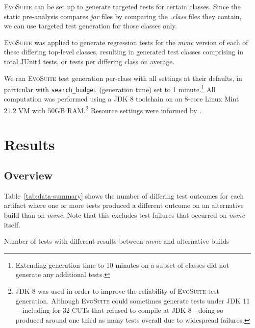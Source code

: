 \documentclass[conference]{IEEEtran}
\makeatletter
\newcommand{\evosuite}{\textsc{EvoSuite}\@\xspace}
\newcommand{\inputgen}[1]{\unskip}
\makeatother
\begin{document}
\evosuite can be set up to generate targeted tests for certain classes. Since the static pre-analysis compares \textit{jar} files by comparing the \textit{.class} files they contain, we can use targeted test generation for those classes only.   

\evosuite was applied to generate regression tests for the \textit{mvnc} version of each of these \inputgen{num-top-level-class-pairs-after-invokevirtual-invokeinterface} differing top-level classes, resulting in \inputgen{num-classes-with-generated-tests} generated test classes comprising in total \inputgen{num-generated-tests} JUnit4 tests, or \inputgen{avg-tests-per-class} tests per differing class on average.

We ran \evosuite test generation per-class with all settings at their defaults, in particular with \texttt{search\_budget} (generation time) set to 1 minute.\footnote{Extending generation time to 10 minutes on a subset of classes did not generate any additional tests.}
All computation was performed using a JDK 8 toolchain on an 8-core Linux Mint 21.2 VM with 50GB RAM.\footnote{JDK 8 was used in order to improve the reliability of \evosuite test generation. Although \evosuite could sometimes generate tests under JDK 11---including for 32 CUTs that refused to compile at JDK 8---doing so produced around one third as many tests overall due to widespread failures.}
Resource settings were informed by \cite{jahangirova2023sbft}. 


\section{Results}
\label{sec:results}

\subsection{Overview}

Table~\ref{tab:data-summary} shows the number of differing test outcomes for each artifact where one or more tests produced a different outcome on an alternative build than on \textit{mvnc}.
Note that this excludes \inputgen{num-test-failures-on-mvnc} test failures that occurred on \textit{mvnc} itself.

\begin{table}[h]
	\centering
    \caption{Number of tests with different results between \textit{mvnc} and alternative builds}
	\label{tab:data-summary}
	\inputgen{data-summary-table-tabular}
	
\end{table}
\end{document}
